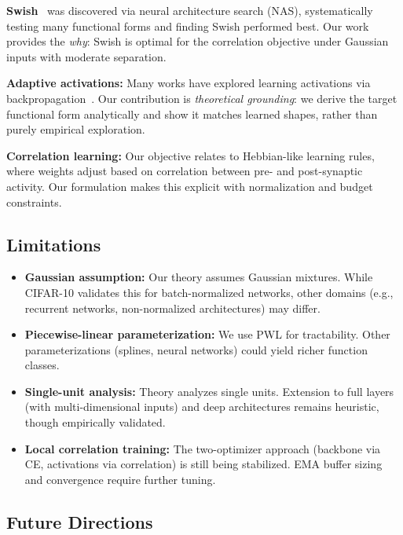 \documentclass{article}
\begin{document}
\textbf{Swish}~\citep{ramachandran2017swish} was discovered via neural architecture search (NAS), systematically testing many functional forms and finding Swish performed best. Our work provides the \textit{why}: Swish is optimal for the correlation objective under Gaussian inputs with moderate separation.

\textbf{Adaptive activations:} Many works have explored learning activations via backpropagation~\citep{agostinelli2014learning}. Our contribution is \textit{theoretical grounding}: we derive the target functional form analytically and show it matches learned shapes, rather than purely empirical exploration.

\textbf{Correlation learning:} Our objective relates to Hebbian-like learning rules, where weights adjust based on correlation between pre- and post-synaptic activity. Our formulation makes this explicit with normalization and budget constraints.

\subsection{Limitations}

\begin{itemize}
\item \textbf{Gaussian assumption:} Our theory assumes Gaussian mixtures. While CIFAR-10 validates this for batch-normalized networks, other domains (e.g., recurrent networks, non-normalized architectures) may differ.
\item \textbf{Piecewise-linear parameterization:} We use PWL for tractability. Other parameterizations (splines, neural networks) could yield richer function classes.
\item \textbf{Single-unit analysis:} Theory analyzes single units. Extension to full layers (with multi-dimensional inputs) and deep architectures remains heuristic, though empirically validated.
\item \textbf{Local correlation training:} The two-optimizer approach (backbone via CE, activations via correlation) is still being stabilized. EMA buffer sizing and convergence require further tuning.
\end{itemize}

\subsection{Future Directions}
\end{document}
